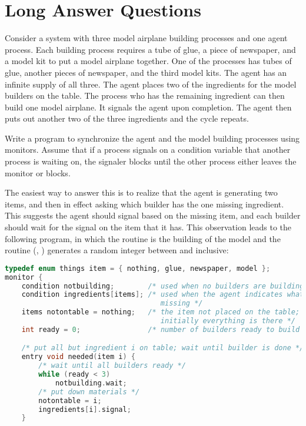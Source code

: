 \documentclass[ecs150,spring2022]{ucdclass3}
\begin{document}
\newpage

\section*{Long Answer Questions}
\begin{enumerate}[start=4]

 Consider a system with three model airplane building processes and one agent process. Each building process requires a tube of glue, a piece of newspaper, and a model kit to put a model airplane together. One of the processes has tubes of glue, another pieces of newspaper, and the third model kits. The agent has an infinite supply of all three. The agent places two of the ingredients for the model builders on the table. The process who has the remaining ingredient can then build one model airplane. It signals the agent upon completion. The agent then puts out another two of the three ingredients and the cycle repeats. 

Write a program to synchronize the agent and the model building processes using monitors. Assume that if a process signals on a condition variable that another process is waiting on, the signaler blocks until the other process either leaves the monitor or blocks.

\begin{ansenv}
The easiest way to answer this is to realize that the agent is generating two items, and then in effect asking which builder has the one missing ingredient.  This suggests the agent should signal based on the missing item, and each builder should wait for the signal on the item that it has.   This observation leads to the following program, in which the routine  is the building of the model and the routine (, ) generates a random integer between  and  inclusive:
\lstset{numbers=left}
\begin{lstlisting}[language=C,morekeywords={parbegin,parend,wait,signal,entry,condition},tabsize=4]
typedef enum things item = { nothing, glue, newspaper, model };
monitor {
	condition notbuilding;        /* used when no builders are building */
	condition ingredients[items]; /* used when the agent indicates what is
									 missing */
	items notontable = nothing;   /* the item not placed on the table;
							   		 initially everything is there */
	int ready = 0;	              /* number of builders ready to build */

	/* put all but ingredient i on table; wait until builder is done */
	entry void needed(item i) {
		/* wait until all builders ready */
		while (ready < 3)
			notbuilding.wait;
		/* put down materials */
		notontable = i;
		ingredients[i].signal;
	}


\end{lstlisting}
\end{ansenv}
\end{enumerate}
\end{document}
